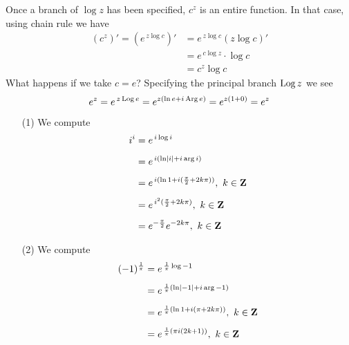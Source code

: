 \medskip

\begin{discussion}
Once a branch of $\log z$ has been specified, $c^z$ is an entire function. In that case, using chain rule we have
\begin{align*}
(c^z)' = (e^{\,z\log c})' &= e^{\,z\log c}(z\log c)'\\[0.5em]
&= e^{\,c\log z}\cdot \log c\\[0.5em]
&= c^z\log c
\end{align*}
What happens if we take $c = e$? Specifying the principal branch $\operatorname{Log} z$ we see
\[e^z = e^{\,z\operatorname{Log} e} = e^{z(\ln e + i\operatorname{Arg} e)} = e^{z(1 + 0)} = e^z\]
\end{discussion}

\medskip

\begin{example}\hfill
\begin{multicols}{2}
\begin{itemize}
\item[(1)] We compute 
\begin{align*}
i^i &= e^{\,i\log i}\\[0.5em]
&= e^{\,i(\ln \left\lvert i\right\rvert + i\arg i)}\\[0.5em]
&= e^{\,i(\ln 1 + i(\frac{\pi}{2} + 2k\pi))},\ k \in \mathbf Z\\[0.5em]
&= e^{\,i^2(\frac{\pi}{2} + 2k\pi)},\ k \in \mathbf Z\\[0.5em]
&= e^{-\frac{\pi}{2}}e^{-2k\pi},\ k \in \mathbf Z
\end{align*}
\item[(2)] We compute
\begin{align*}
(-1)^{\frac{1}{\pi}} &= e^{\,\frac{1}{\pi}\log -1}\\[0.5em]
&= e^{\,\frac{1}{\pi}(\ln \abs{-1} + i\arg -1)}\\[0.5em]
&= e^{\,\frac{1}{\pi}(\ln 1 + i(\pi + 2k\pi))},\ k \in \zz\\[0.5em]
&= e^{\,\frac{1}{\pi}(\pi i(2k + 1))},\ k \in \zz\\[0.5em]

\end{align*}
\end{itemize}
\end{multicols}
\end{example}
